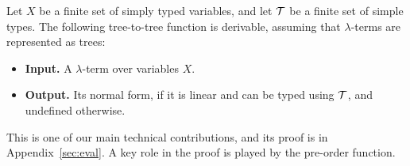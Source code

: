 



\begin{theorem}\label{thm:normalise} Let $X$ be a finite set of simply typed variables, and let $\mathcal T$ be a finite set of simple types.
    The following tree-to-tree function is derivable, assuming that $\lambda$-terms are represented as trees:
    \begin{itemize}
        \item{\bf Input.} A $\lambda$-term over variables $X$.
        \item {\bf Output.} Its normal form, if it is linear and  can be typed using ${\mathcal T}$, and undefined otherwise.
    \end{itemize}
\end{theorem}

This is one of our main technical contributions, and its proof is in Appendix~\ref{sec:eval}. A key role in the proof is played by the pre-order function. 




